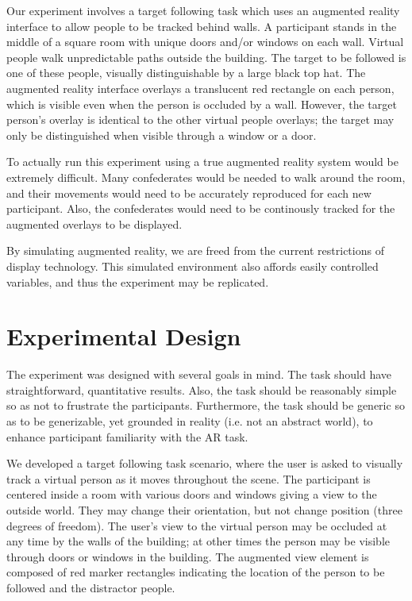 \documentclass{acmsiggraph}                     %
\begin{document}
Our experiment involves a target following task which uses an augmented reality interface to allow people to be tracked behind walls.  A participant stands in the middle of a square room with unique doors and/or windows on each wall.  Virtual people walk unpredictable paths outside the building.  The target to be followed is one of these people, visually distinguishable by a large black top hat.  The augmented reality interface overlays a translucent red rectangle on each person, which is visible even when the person is occluded by a wall.  However, the target person's overlay is identical to the other virtual people overlays; the target may only be distinguished when visible through a window or a door.

To actually run this experiment using a true augmented reality system would be extremely difficult.  Many confederates would be needed to walk around the room, and their movements would need to be accurately reproduced for each new participant.  Also, the confederates would need to be continously tracked for the augmented overlays to be displayed.%

By simulating augmented reality, we are freed from the current restrictions of display technology.  This simulated environment also affords easily controlled variables, and thus the experiment may be replicated.

\section{Experimental Design}

The experiment was designed with several goals in mind.  The task should have straightforward, quantitative results.  Also, the task should be reasonably simple so as not to frustrate the participants.  Furthermore, the task should be generic so as to be generizable, yet grounded in reality (i.e. not an abstract world), to enhance participant familiarity with the AR task.

We developed a target following task scenario, where the user is asked to visually track a virtual person as it moves throughout the scene.  The participant is centered inside a room with various doors and windows giving a view to the outside world.  They may change their orientation, but not change position (three degrees of freedom).  The user's view to the virtual person may be occluded at any time by the walls of the building; at other times the person may be visible through doors or windows in the building.  The augmented view element is composed of red marker rectangles indicating the location of the person to be followed and the distractor people.
\end{document}
